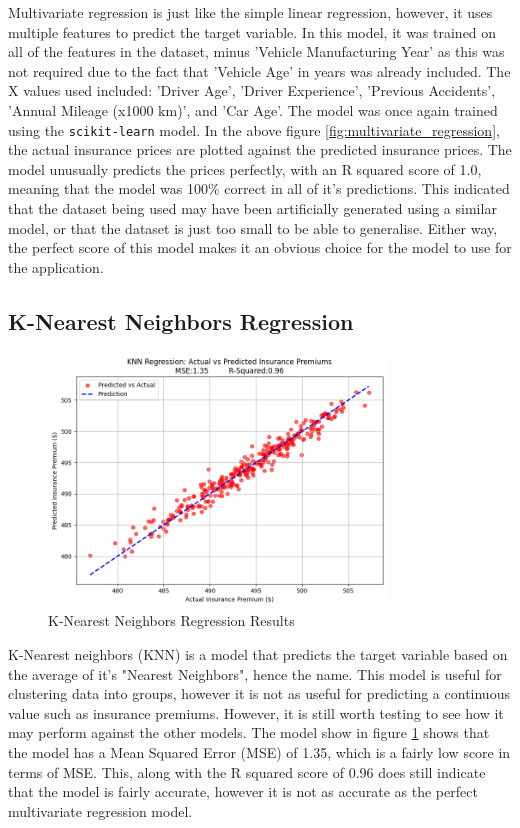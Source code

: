 \documentclass{article}
\begin{document}
Multivariate regression is just like the simple linear regression, however, it uses multiple features to predict the target variable. In this model, it was trained on all of the features in the dataset, minus 'Vehicle Manufacturing Year' as this was not required due to the fact that 'Vehicle Age' in years was already included. The X values used included: 'Driver Age', 'Driver Experience', 'Previous Accidents', 'Annual Mileage (x1000 km)', and 'Car Age'. The model was once again trained using the \texttt{scikit-learn} model\cite{scikit_LR}. In the above figure \ref{fig:multivariate_regression}, the actual insurance prices are plotted against the predicted insurance prices. The model unusually predicts the prices perfectly, with an R squared score of 1.0, meaning that the model was 100\% correct in all of it's predictions. This indicated that the dataset being used may have been artificially generated using a similar model, or that the dataset is just too small to be able to generalise. Either way, the perfect score of this model makes it an obvious choice for the model to use for the application.

\newpage

\subsection{K-Nearest Neighbors Regression}

\begin{figure}[h]
\centering
\includegraphics[width=0.8\textwidth]{knn_regression.png}
\caption{K-Nearest Neighbors Regression Results}\label{fig:knn_regression}
\end{figure}

K-Nearest neighbors (KNN) is a model that predicts the target variable based on the average of it's "Nearest Neighbors", hence the name. This model is useful for clustering data into groups, however it is not as useful for predicting a continuous value such as insurance premiums. However, it is still worth testing to see how it may perform against the other models. The model show in figure \ref{fig:knn_regression} shows that the model has a Mean Squared Error (MSE) of 1.35, which is a fairly low score in terms of MSE. This, along with the R squared score of 0.96 does still indicate that the model is fairly accurate, however it is not as accurate as the perfect multivariate regression model.
\end{document}
